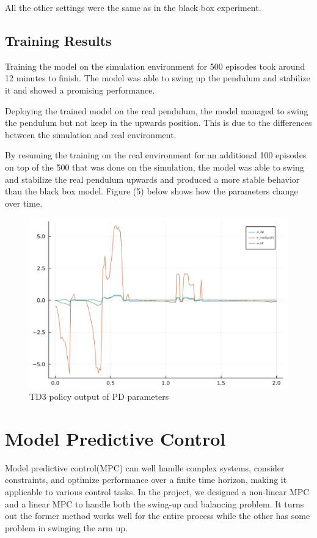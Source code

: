 \documentclass{LTHtwocol} %
\begin{document}
All the other settings were the same as in the black box experiment.

\subsection{Training Results}
Training the model on the simulation environment for 500 episodes took around 12 minutes to finish. The model was able to swing up the pendulum and stabilize it and showed a promising performance.

Deploying the trained model on the real pendulum, the model managed to swing the pendulum but not keep in the upwards position. This is due to the differences between the simulation and real environment.

By resuming the training on the real environment for an additional 100 episodes on top of the 500 that was done on the simulation, the model was able to swing and stabilize the real pendulum upwards and produced a more stable behavior than the black box model.
Figure (5) below shows how the parameters change over time.
\begin{figure}[h]
    \centering
    \includegraphics[width=0.7\columnwidth]{pic/pd params.png}
    \caption{TD3 policy output of PD parameters}
    \label{fig:my_label}
\end{figure}

\section{Model Predictive Control}
Model predictive control(MPC) can well handle complex systems, consider constraints, and optimize performance over a finite time horizon, making it applicable to various control tasks. In the project, we designed a non-linear MPC and a linear MPC to handle both the swing-up and balancing problem. It turns out the former method works well for the entire process while the other has some problem in swinging the arm up.
\end{document}
